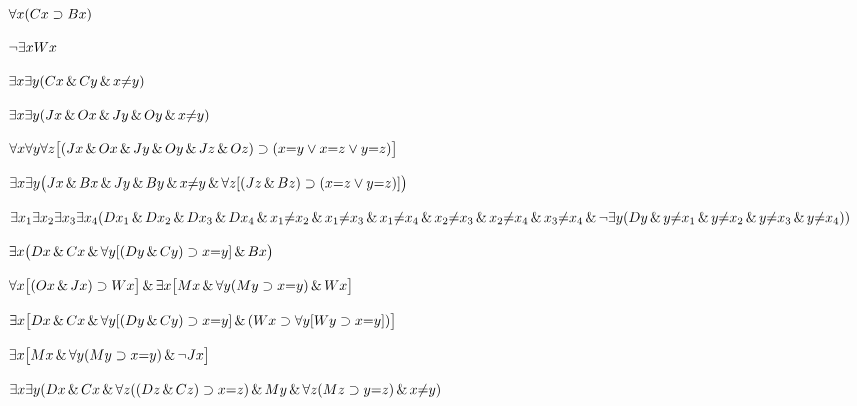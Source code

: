 \begin{earg}
\item %
$\forall x(Cx \supset Bx)$
\item %
$\neg\exists x Wx$
\item %
$\exists x \exists y(Cx \,\&\, Cy \,\&\, x{\neq} y)$
\item %
$\exists x \exists y(Jx \,\&\, Ox \,\&\, Jy \,\&\, Oy \,\&\, x{\neq} y)$
\item %
$\forall x\forall y\forall z\bigl[(Jx \,\&\, Ox \,\&\, Jy \,\&\, Oy \,\&\, Jz \,\&\, Oz)\supset(x{=}y \vee x{=}z \vee y{=}z)\bigr]$
\item %
$\exists x\exists y\bigl(Jx \,\&\, Bx \,\&\, Jy \,\&\, By \,\&\, x {\neq} y\,\&\, \forall z[(Jz \,\&\, Bz) \supset (x{=}z \vee y{=}z)]\bigr)$
\item %
$\exists x_1\exists x_2\exists x_3\exists x_4 (Dx_1 \,\&\, Dx_2 \,\&\, Dx_3 \,\&\, Dx_4 \,\&\, x_1 {\neq} x_2 \,\&\, x_1 {\neq} x_3 \,\&\, x_1 {\neq} x_4 \,\&\, x_2 {\neq} x_3 \,\&\, x_2 {\neq} x_4 \,\&\, x_3 {\neq} x_4 \\  \,\&\, \neg\exists y(Dy \,\&\, y{\neq} x_1 \,\&\, y{\neq}x_2 \,\&\, y{\neq} x_3 \,\&\, y{\neq} x_4))$
\item %
$\exists x\bigl(Dx \,\&\, Cx \,\&\, \forall y[(Dy\,\&\, Cy) \supset x{=}y] \,\&\, Bx\bigr)$
\item %
$\forall x\bigl[(Ox \,\&\, Jx) \supset Wx\bigr] \,\&\, \exists x\bigl[Mx \,\&\, \forall y(My \supset x{=}y) \,\&\, Wx\bigr]$
\item %
$\exists x \bigl[Dx \,\&\, Cx \,\&\, \forall y[(Dy\,\&\, Cy) \supset x{=}y] \,\&\, (Wx \supset \forall y [Wy \supset x{=}y])\bigr]$
\item %
$\exists x\bigl[Mx \,\&\, \forall y(My \supset x{=}y) \,\&\, \neg Jx\bigr]$
\item %
$\exists x \exists y (Dx \,\&\, Cx\,\&\, \forall z ((Dz \,\&\, Cz) \supset x{=}z) \,\&\, My \,\&\, \forall z (Mz \supset y{=}z) \,\&\, x{\neq}y)$\end{earg}



